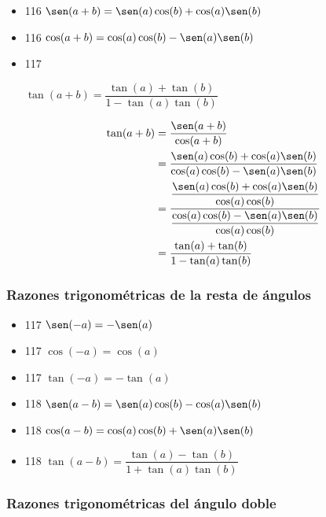 \documentclass[11pt]{article}
\begin{document}
\begin{itemize}
\item 116 \(\sen(a + b) = \sen(a)\cos(b) + \cos(a)\sen(b)\)

\item 116 \(\cos(a + b) = \cos(a)\cos(b) - \sen(a)\sen(b)\)

\item 117
\begin{teorema}
\(\tan(a+b) = \dfrac{\tan(a)+\tan(b)}{1-\tan(a)\tan(b)}\)
\end{teorema}
\begin{demostracion}
\begin{align*}
\tan(a+b) &= \dfrac{\sen(a+b)}{\cos(a+b)} \\
          &= \dfrac{\sen(a)\cos(b)+\cos(a)\sen(b)}
                   {\cos(a)\cos(b)-\sen(a)\sen(b)} \\
          &= \dfrac{\dfrac{\sen(a)\cos(b)+\cos(a)\sen(b)}{\cos(a)\cos(b)}}
                   {\dfrac{\cos(a)\cos(b)-\sen(a)\sen(b)}{\cos(a)\cos(b)}} \\
          &= \dfrac{\tan(a)+\tan(b)}{1-\tan(a)\tan(b)} \\
\end{align*}
\end{demostracion}
\end{itemize}

\subsubsection{Razones trigonométricas de la resta de ángulos}
\label{sec:org9acae32}

\begin{itemize}
\item 117 \(\sen(-a) = -\sen(a)\)

\item 117 \(\cos(-a) = \cos(a)\)

\item 117 \(\tan(-a) = -\tan(a)\)

\item 118 \(\sen(a-b) = \sen(a)\cos(b) - \cos(a)\sen(b)\)

\item 118 \(\cos(a-b) = \cos(a)\cos(b) + \sen(a)\sen(b)\)

\item 118 \(\tan(a-b) = \dfrac{\tan(a) - \tan(b)}{1 + \tan(a)\tan(b)}\)
\end{itemize}

\subsubsection{Razones trigonométricas del ángulo doble}
\label{sec:org898db59}
\end{document}

